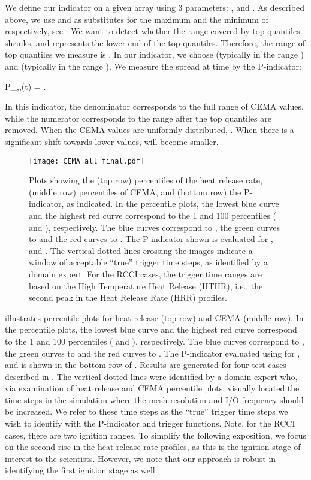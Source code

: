 \documentclass[final]{siamltex}
\newcommand{\pmetric}{P}
\newcommand{\pt}{{p}}
\newcommand{\be}{}
\begin{document}
We define our indicator on a given array  using 3 parameters: ,
 and .  As described above, we use  and
 as substitutes for the maximum and the minimum of 
respectively, see . We  want to detect whether the range
covered by top quantiles shrinks, and  represents the lower end of the
top quantiles. Therefore, the  range of top quantiles we  measure is
.  In our indicator, we choose  (typically in the range ) and  (typically in the
range ). We measure the spread at time  by the
\pmetric-indicator:
\be
\pmetric_{\alpha,\beta,\gamma}(t) = \frac{\pt_\alpha(t) - \pt_\gamma(t)}{\pt_\beta(t) - \pt_\gamma(t)}.
\label{eq:pmetric}
\ee

\noindent In this indicator,  the denominator corresponds to the full range of CEMA values,  while  the 
numerator  corresponds to the  range  after the  top quantiles are removed.
 When the CEMA values are uniformly distributed, 
   .
When there is a significant shift towards lower values,  will become smaller.

\begin{figure}[H]
\centering
\texttt{[image: CEMA\_all\_final.pdf]}
\caption{\label{fig:CEMA} Plots showing the (top row) percentiles of the
heat release rate, (middle row) percentiles of CEMA, and (bottom row) the
\pmetric-indicator, as indicated. In the percentile plots, the lowest
blue curve and the highest red curve correspond to the 1 and
100 percentiles ( and ), respectively. The blue curves
correspond to , the green curves to 
and the red curves to . The \pmetric-indicator shown is
evaluated for ,  and .
The vertical dotted lines crossing the images indicate a window of
acceptable ``true'' trigger time steps, as identified by a domain expert.
For the RCCI cases, the trigger time ranges are based on the High Temperature
Heat Release (HTHR), i.e., the second peak in the Heat Release Rate (HRR) profiles. }
\end{figure}

 illustrates percentile plots for heat release (top row) and CEMA
(middle row).  In the percentile plots, the lowest
blue curve and the highest red curve correspond to the 1 and
100 percentiles ( and ), respectively. The blue curves
correspond to , the green curves to 
and the red curves to . 
The \pmetric-indicator evaluated using  for ,
 and  is shown in the bottom row of . 
Results are generated for four test cases described in .
The vertical dotted lines were identified  by a domain expert who, via examination
of heat release and CEMA percentile plots, visually
located the time steps in the simulation where the mesh resolution and I/O
frequency should  be increased. We refer to these time steps  
as the ``true'' trigger time steps we wish to identify with the 
\pmetric-indicator and trigger functions. Note, for the RCCI cases, there are two ignition ranges.
To simplify the following exposition, we focus on the second rise in the heat release rate
profiles, as this is the ignition stage of interest to the scientists. However,
we note that our approach is robust in identifying the first ignition stage as
well.
\end{document}
